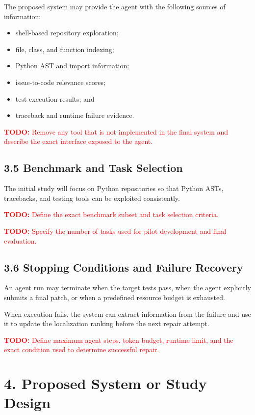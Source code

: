 \documentclass[11pt]{article}
\newcommand{\todo}[1]{%
    \textcolor{red}{\textbf{TODO:} #1}%
}
\begin{document}
The proposed system may provide the agent with the following sources of
information:

\begin{itemize}[leftmargin=*, itemsep=0.25em]
    \item shell-based repository exploration;
    \item file, class, and function indexing;
    \item Python AST and import information;
    \item issue-to-code relevance scores;
    \item test execution results; and
    \item traceback and runtime failure evidence.
\end{itemize}

\todo{Remove any tool that is not implemented in the final system and
describe the exact interface exposed to the agent.}


\subsection*{3.5 Benchmark and Task Selection}

The initial study will focus on Python repositories so that Python ASTs,
tracebacks, and testing tools can be exploited consistently.

\todo{Define the exact benchmark subset and task selection criteria.}

\todo{Specify the number of tasks used for pilot development and final
evaluation.}


\subsection*{3.6 Stopping Conditions and Failure Recovery}

An agent run may terminate when the target tests pass, when the agent
explicitly submits a final patch, or when a predefined resource budget
is exhausted.

When execution fails, the system can extract information from the
failure and use it to update the localization ranking before the next
repair attempt.

\todo{Define maximum agent steps, token budget, runtime limit, and the
exact condition used to determine successful repair.}


\section*{4. Proposed System or Study Design}
\end{document}
